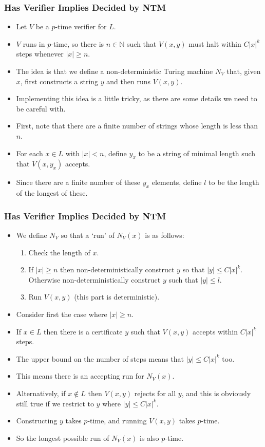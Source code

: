 \documentclass[handout]{beamer}
\newcommand{\bN}{\mathbb{N}}
\begin{document}
\begin{frame}
\frametitle{Has Verifier Implies Decided by NTM}
\begin{itemize}
\item Let $V$ be a $p$-time verifier for $L$. 
\item $V$ runs in $p$-time, so there is $n\in\bN$ such that $V(x,y)$ must halt within $C|x|^k$ steps whenever $|x|\geq n$. 
\item The idea is that we define a non-deterministic Turing machine $N_V$ that, given $x$, first constructs a string $y$ and then runs $V(x,y)$. 
\item Implementing this idea is a little tricky, as there are some details we need to be careful with. 
\item First, note that there are a finite number of strings whose length is less than $n$. 
\item For each $x\in L$ with $|x|<n$, define $y_x$ to be a string of minimal length such that $V(x,y_x)$ accepts. 
\item Since there are a finite number of these $y_x$ elements, define $l$ to be the length of the longest of these. 
\end{itemize}
\end{frame}

\begin{frame}
\frametitle{Has Verifier Implies Decided by NTM}
\begin{itemize}
\item We define $N_V$ so that a `run' of $N_V(x)$ is as follows:
\begin{enumerate}
\item Check the length of $x$.
\item If $|x|\geq n$ then non-deterministically construct $y$ so that $|y|\leq C|x|^k$. Otherwise non-deterministically construct $y$ such that $|y|\leq l$.
\item Run $V(x,y)$ (this part is deterministic).
\end{enumerate}
\item Consider first the case where $|x|\geq n$. 
\item If $x\in L$ then there is a certificate $y$ such that $V(x,y)$ accepts within $C|x|^k$ steps. 
\item The upper bound on the number of steps means that $|y|\leq C|x|^k$ too. 
\item This means there is an accepting run for $N_V(x)$. 
\item Alternatively, if $x\notin L$ then $V(x,y)$ rejects for all $y$, and this is obviously still true if we restrict to $y$ where $|y|\leq C|x|^k$. 
\item Constructing $y$ takes $p$-time, and running $V(x,y)$ takes $p$-time. 
\item So the longest possible run of $N_V(x)$ is also $p$-time.
\end{itemize}
\end{frame}
\end{document}
